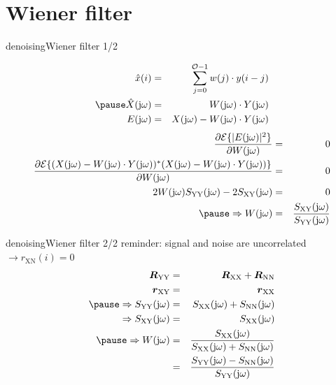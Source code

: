 \section{Wiener filter}
	\begin{frame}{denoising}{Wiener filter 1/2}
        \begin{footnotesize}
        \begin{eqnarray*}
            \hat{x}(i) &=& \sum\limits_{j=0}^{\mathcal{O}-1} w(j)\cdot y(i-j)\\
            \pause
            \hat{X}(\jom) &=& W(\jom)\cdot Y(\jom)\\
            E(\jom) &=& X(\jom) - W(\jom)\cdot Y(\jom)
        \end{eqnarray*}
            \pause
            \bigskip
        \begin{eqnarray*}
            \frac{\partial \mathcal{E}\lbrace |E(\jom)|^2\rbrace}{\partial W(\jom)} &=& 0\\
            \frac{\partial \mathcal{E}\lbrace (X(\jom) - W(\jom)\cdot Y(\jom))^*(X(\jom) - W(\jom)\cdot Y(\jom))\rbrace}{\partial W(\jom)} &=& 0\\
            2W(\jom)S_\mathrm{YY}(\jom) - 2S_\mathrm{XY}(\jom) &=&0\\
            \pause
            \bigskip\Rightarrow
            W(\jom) &=& \frac{S_\mathrm{XY}(\jom)}{S_\mathrm{YY}(\jom)}
        \end{eqnarray*}
        \end{footnotesize}
 	\end{frame}

	\begin{frame}{denoising}{Wiener filter 2/2}
       reminder: signal and noise are uncorrelated $\rightarrow r_\mathrm{XN}(i) = 0$
        \begin{eqnarray*}
            \mat{R}_\mathrm{YY} &=& \mat{R}_\mathrm{XX} + \mat{R}_\mathrm{NN}\\
            \vec{r}_\mathrm{XY} &=& \vec{r}_\mathrm{XX}\\
            \bigskip
            \pause
            \Rightarrow {S}_\mathrm{YY}(\jom) &=& {S}_\mathrm{XX}(\jom) + {S}_\mathrm{NN}(\jom)\\
            \Rightarrow {S}_\mathrm{XY}(\jom) &=& {S}_\mathrm{XX}(\jom)\\
            \pause
            \bigskip
            \Rightarrow
            W(\jom) &=& \frac{S_\mathrm{XX}(\jom)}{{S}_\mathrm{XX}(\jom) + {S}_\mathrm{NN}(\jom)}\\
            \bigskip
            &=& \frac{S_\mathrm{YY}(\jom) - S_\mathrm{NN}(\jom)}{{S}_\mathrm{YY}(\jom)}
        \end{eqnarray*}
 	\end{frame}

